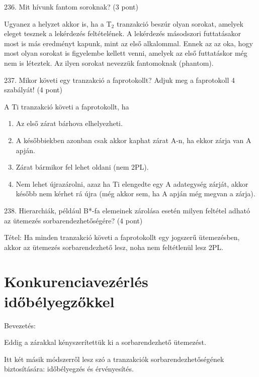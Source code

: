 \documentclass[a4paper,11.5pt, table]{article}
\begin{document}
236. Mit hívunk fantom soroknak? (3 pont)
	\begin{compactitem}
		\item Ugyanez a helyzet akkor is, ha a T$ _{2} $ tranzakció beszúr olyan sorokat, amelyek eleget tesznek a lekérdezés feltételének. A lekérdezés másodszori futtatásakor most is más eredményt kapunk, mint az első alkalommal. 
		Ennek az az oka, hogy most olyan sorokat is figyelembe kellett venni, amelyek az első futtatáskor még nem is léteztek. 
		Az ilyen sorokat nevezzük fantomoknak (phantom).
	\end{compactitem}
237. Mikor követi egy tranzakció a faprotokollt? Adjuk meg a faprotokoll 4 szabályát! (4 pont)
	\begin{compactitem}
		\item A Ti tranzakció követi a faprotokollt, ha
		\begin{enumerate}
			\item Az első zárat bárhova elhelyezheti.
			\item A későbbiekben azonban csak akkor kaphat zárat A-n, ha ekkor zárja van A apján.
			\item Zárat bármikor fel lehet oldani (nem 2PL).
			\item Nem lehet újrazárolni, azaz ha Ti elengedte egy A adategység zárját, akkor később nem kérhet rá újra (még akkor sem, ha A apján még megvan a zárja).
		\end{enumerate}
	\end{compactitem}		

238. Hierarchiák, például B*-fa elemeinek zárolása esetén milyen feltétel adható az ütemezés sorbarendezhetőségére? (4 pont)
	\begin{compactitem}
		\item Tétel: Ha minden tranzakció követi a faprotokollt egy jogszerű ütemezésben, akkor az ütemezés sorbarendezhető lesz, noha nem feltétlenül lesz 2PL.
	\end{compactitem}

\section{Konkurenciavezérlés időbélyegzőkkel}

Bevezetés:
	\begin{compactitem}
		\item Eddig a zárakkal kényszerítettük ki a sorbarendezhető ütemezést.
		\item Itt két másik módszerről lesz szó a tranzakciók sorbarendezhetőségének biztosítására: időbélyegzés és érvényesítés.
	\end{compactitem}		
\end{document}
